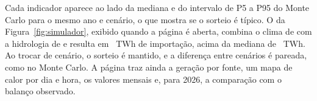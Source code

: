 Cada indicador aparece ao lado da mediana e do intervalo de P5 a P95 do Monte Carlo para o mesmo ano e cenário, o que mostra se o sorteio é típico. O da Figura~\ref{fig:simulador}, exibido quando a página é aberta, combina o clima de \SimClima{} com a hidrologia de \SimHidro{} e resulta em \SimImp~TWh de importação, acima da mediana de \ImpCenMed~TWh. Ao trocar de cenário, o sorteio é mantido, e a diferença entre cenários é pareada, como no Monte Carlo. A página traz ainda a geração por fonte, um mapa de calor por dia e hora, os valores mensais e, para 2026, a comparação com o balanço observado.
